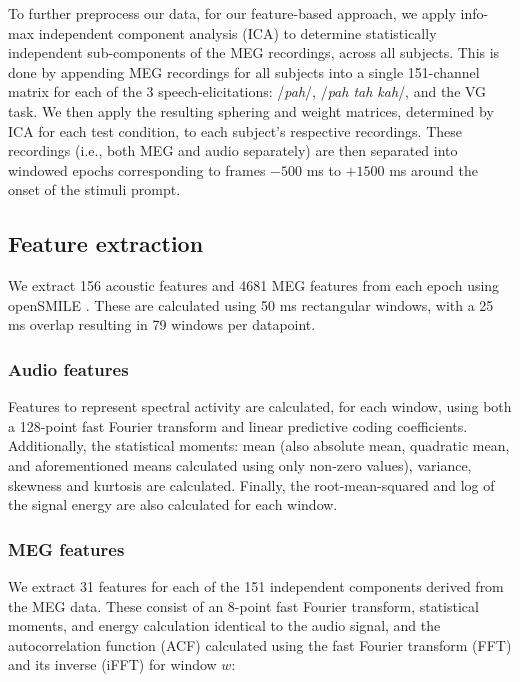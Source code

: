 \documentclass[utf8]{frontiersSCNS} %
\begin{document}
To further preprocess our data, for our feature-based approach, we apply info-max independent component analysis (ICA) \cite{Bell1995} to determine statistically independent sub-components of the MEG recordings, across all subjects. This is done by appending MEG recordings for all subjects into a single 151-channel matrix for each of the 3 speech-elicitations: /{\em pah}/, /{\em pah tah kah}/, and the VG task. We then apply the resulting sphering and weight matrices, determined by ICA for each test condition, to each subject's respective recordings. These recordings (i.e., both MEG and audio separately) are then separated into windowed epochs corresponding to frames $-500$ ms to $+1500$ ms around the onset of the stimuli prompt.

\subsection{Feature extraction}

We extract 156 acoustic features and 4681 MEG features from each epoch using openSMILE \cite{Eyben13-RDI}. These are calculated using 50 ms rectangular windows, with a 25 ms overlap resulting in 79 windows per datapoint.

\subsubsection{Audio features}

Features to represent spectral activity are calculated, for each window, using both a 128-point fast Fourier transform and linear predictive coding coefficients. Additionally, the statistical moments: mean (also absolute mean, quadratic mean, and aforementioned means calculated using only non-zero values), variance, skewness and kurtosis are calculated. Finally, the root-mean-squared and log of the signal energy are also calculated for each window.

\subsubsection{MEG features}

We extract 31 features for each of the 151 independent components derived from the MEG data. These consist of an 8-point fast Fourier transform, statistical moments, and energy calculation identical to the audio signal, and the autocorrelation function (ACF) calculated using the fast Fourier transform (FFT) and its inverse (iFFT) for window $w$:
\end{document}
